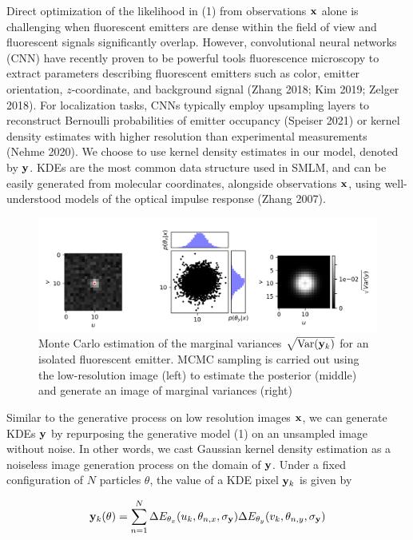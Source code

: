 \documentclass{article}
\begin{document}
Direct optimization of the likelihood in (1) from observations $\bold{x}$ alone is challenging when fluorescent emitters are dense within the field of view and fluorescent signals significantly overlap. However, convolutional neural networks (CNN) have recently proven to be powerful tools fluorescence microscopy to extract parameters describing fluorescent emitters such as color, emitter orientation, $z$-coordinate, and background signal (Zhang 2018; Kim 2019; Zelger 2018). For localization tasks, CNNs typically employ upsampling layers to reconstruct Bernoulli probabilities of emitter occupancy (Speiser 2021) or kernel density estimates with higher resolution than experimental measurements (Nehme 2020). We choose to use kernel density estimates in our model, denoted by $\bold{y}$. KDEs are the most common data structure used in SMLM, and can be easily generated from molecular coordinates, alongside observations $\bold{x}$, using well-understood models of the optical impulse response (Zhang 2007). 

\begin{figure}
\includegraphics[scale=0.7]{MCMC.png}
\caption{Monte Carlo estimation of the marginal variances $\sqrt{\mathrm{Var}(\bold{y}_k)}$ for an isolated fluorescent emitter. MCMC sampling is carried out using the low-resolution image (left) to estimate the posterior (middle) and generate an image of marginal variances (right)}
\end{figure}

Similar to the generative process on low resolution images $\bold{x}$, we can generate KDEs $\bold{y}$ by repurposing the generative model (1) on an unsampled image without noise. In other words, we cast Gaussian kernel density estimation as a noiseless image generation process on the domain of $\bold{y}$. Under a fixed configuration of $N$ particles $\theta$, the value of a KDE pixel $\bold{y}_{k}$ is given by

\begin{equation}
\bold{y}_{k}(\theta) = \sum_{n=1}^{N}\Delta E_{\theta_x}(u_{k},\theta_{n,x},\sigma_{\bold{y}}) \Delta E_{\theta_y}(v_{k},\theta_{n,y},\sigma_{\bold{y}})
\end{equation}
\end{document}
